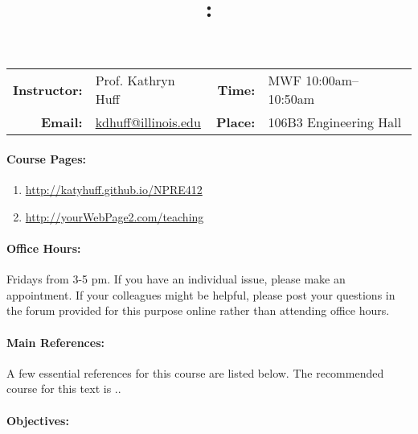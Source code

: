 \documentclass[11pt, a4paper]{article}
\title{\CourseNumber: \CourseTitle\\}
\author{\CourseUniversity}
\date{\CourseSemester \CourseYear}
\makeatletter
\newcommand{\CourseNumber}{NPRE412}
\newcommand{\CourseInstructor}{Prof. Kathryn Huff\xspace}%
\newcommand{\CourseDays}{MWF\xspace}%
\newcommand{\CourseStart}{10:00am\xspace}%
\newcommand{\CourseEnd}{10:50am\xspace}%
\newcommand{\CourseInstructorEmail}{kdhuff@illinois.edu}
\newcommand{\CourseRoom}{106B3\xspace}%
\newcommand{\CourseBuilding}{Engineering Hall\xspace}%
\makeatother
\begin{document}
\maketitle
\renewcommand{\arraystretch}{2}
\begin{center}
\begin{table}[h]
\begin{tabularx}{\textwidth}{rXrX}
\hline
\textbf{Instructor:} & \CourseInstructor & \textbf{Time:} & \CourseDays \CourseStart -- \CourseEnd \\
\textbf{Email:} &  \href{mailto:\CourseInstructorEmail}{\CourseInstructorEmail} & \textbf{Place:} & \CourseRoom \CourseBuilding\\
\hline
\end{tabularx}
\end{table}
\end{center}

\paragraph{Course Pages:}
\begin{enumerate}
\item \url{http://katyhuff.github.io/\CourseNumber}
\item \url{http://yourWebPage2.com/teaching}
\end{enumerate}

\paragraph{Office Hours:} Fridays from 3-5 pm. If you have an individual issue, 
please make an appointment. If your colleagues might be helpful, please post your 
questions in the forum provided for this purpose online rather than attending 
office hours.

\paragraph{Main References:}
A few essential references for this course are listed below. The recommended 
course for this text is \cite{tsoulfanidis_nuclear_2013}..
\nocite{*}

\renewcommand{\refname}{\normalfont\selectfont\normalsize}\vspace{-1cm} 


\paragraph{Objectives:} 
\end{document}
